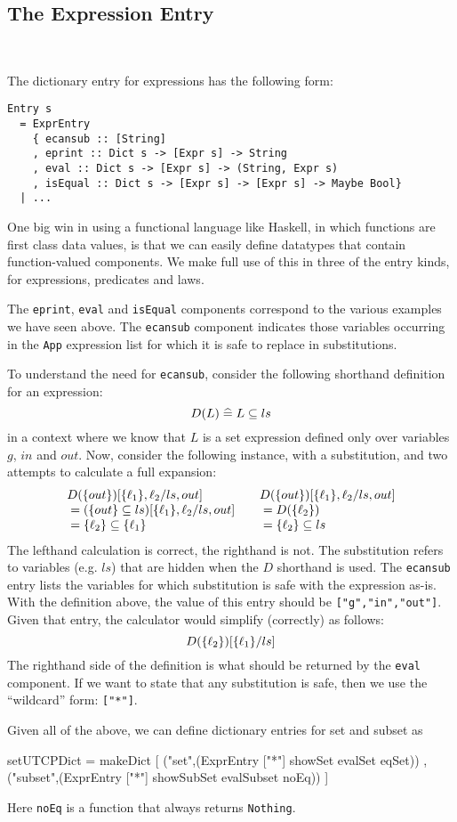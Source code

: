 \subsection{The Expression Entry}~

The dictionary entry for expressions has the following form:
\begin{verbatim}
Entry s
  = ExprEntry
    { ecansub :: [String]
    , eprint :: Dict s -> [Expr s] -> String
    , eval :: Dict s -> [Expr s] -> (String, Expr s)
    , isEqual :: Dict s -> [Expr s] -> [Expr s] -> Maybe Bool}
  | ...
\end{verbatim}
One big win in using a functional language like Haskell,
in which functions are first class data values,
is that we can easily define datatypes that
contain function-valued components.
We make full use of this in three of the entry kinds,
for expressions, predicates and laws.

The \texttt{eprint}, \texttt{eval} and \texttt{isEqual} components correspond
to the various examples we have seen above.
The \texttt{ecansub} component
indicates those variables occurring in the \texttt{App} expression
list for which it is safe to replace in substitutions.

To understand the need for \texttt{ecansub},
consider the following shorthand definition for an expression:
\[
  D(L) \mathrel{\widehat=} L \subseteq ls
\]
in a context where we know that $L$ is a set expression defined
only over variables $g$, $in$ and $out$.
Now, consider the following instance, with a substitution,
and two attempts to calculate a full expansion:
\[\begin{array}{l@{\qquad}l}
   D(\setof{out})[\setof{\ell_1},\ell_2/ls,out]
 & D(\setof{out})[\setof{\ell_1},\ell_2/ls,out]
\\ {} = (\setof{out} \subseteq ls)[\setof{\ell_1},\ell_2/ls,out]
 & {}= D(\setof{\ell_2})
\\ {} = \setof{\ell_2} \subseteq \setof{\ell_1}
 & {} = \setof{\ell_2} \subseteq ls
\end{array}\]
The lefthand calculation is correct, the righthand is not.
The substitution refers to variables (e.g. $ls$)
that are hidden when the $D$ shorthand is used.
The \texttt{ecansub} entry lists the variables for which substitution
is safe with the expression as-is.
With the definition above, the value of this entry
 should be \texttt{["g","in","out"]}.
Given that entry, the calculator would simplify (correctly) as follows:
\[
  D(\{{\ell_2}\})[\{{\ell_1}\}/ls]
\]
The righthand side of the definition is what should be returned
by the \texttt{eval} component.
If we want to state that any substitution is safe,
then we use the ``wildcard'' form: \texttt{["*"]}.

Given all of the above,
we can define dictionary entries for set and subset as
\begin{code}
setUTCPDict
 = makeDict
    [ ("set",(ExprEntry ["*"] showSet evalSet eqSet))
    , ("subset",(ExprEntry ["*"] showSubSet evalSubset noEq)) ]
\end{code}
Here \texttt{noEq} is a function that always returns \texttt{Nothing}.
